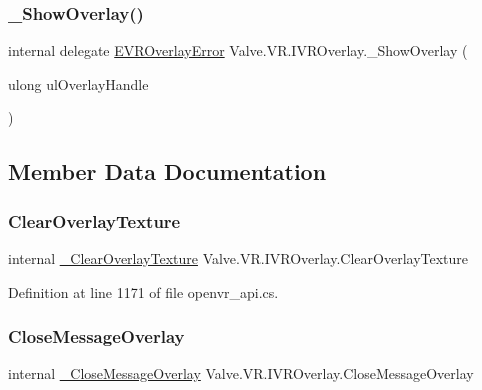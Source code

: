 \mbox{\label{struct_valve_1_1_v_r_1_1_i_v_r_overlay_a4790f23bb779178e96a7b54765d0406f}} 
\subsubsection{\texorpdfstring{\_ShowOverlay()}{\_ShowOverlay()}}
{\footnotesize\ttfamily internal delegate \mbox{\hyperlink{namespace_valve_1_1_v_r_aaee5c5144f42b7969d45b854f51b0c18}{E\+V\+R\+Overlay\+Error}} Valve.\+V\+R.\+I\+V\+R\+Overlay.\+\_\+\+Show\+Overlay (\begin{DoxyParamCaption}\item[{ulong}]{ul\+Overlay\+Handle }\end{DoxyParamCaption})}



\subsection{Member Data Documentation}
\mbox{\label{struct_valve_1_1_v_r_1_1_i_v_r_overlay_a2c8f47910e508e94f9cb380d4595ad3a}} 
\subsubsection{\texorpdfstring{ClearOverlayTexture}{ClearOverlayTexture}}
{\footnotesize\ttfamily internal \mbox{\hyperlink{struct_valve_1_1_v_r_1_1_i_v_r_overlay_a61c25dec5b16f1e2d942f792c7adc53b}{\+\_\+\+Clear\+Overlay\+Texture}} Valve.\+V\+R.\+I\+V\+R\+Overlay.\+Clear\+Overlay\+Texture}



Definition at line 1171 of file openvr\+\_\+api.\+cs.

\mbox{\label{struct_valve_1_1_v_r_1_1_i_v_r_overlay_a775930fee28a56a0c8a04e4dbf0d52e2}} 
\subsubsection{\texorpdfstring{CloseMessageOverlay}{CloseMessageOverlay}}
{\footnotesize\ttfamily internal \mbox{\hyperlink{struct_valve_1_1_v_r_1_1_i_v_r_overlay_a66281ebc63f5c30dc48e38ec5c4c8c5e}{\+\_\+\+Close\+Message\+Overlay}} Valve.\+V\+R.\+I\+V\+R\+Overlay.\+Close\+Message\+Overlay}



